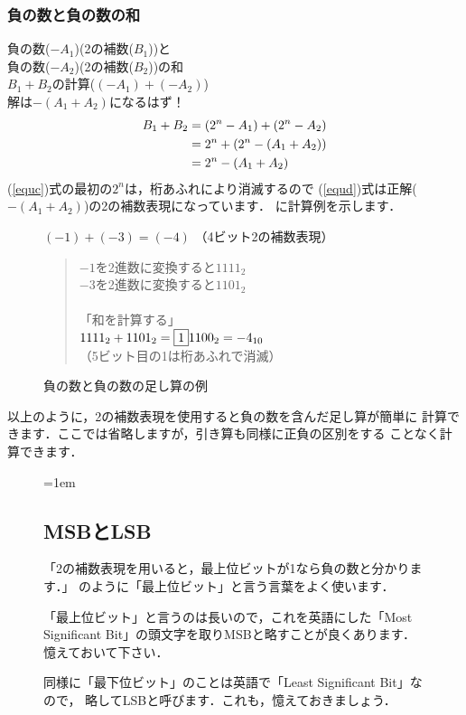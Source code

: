 \subsubsection{負の数と負の数の和}
負の数($-A_1$)(2の補数($B_1$))と\\
負の数($-A_2$)(2の補数($B_2$))の和\\
$B_1 + B_2$の計算($(-A_1) + (-A_2)$)\\
解は$-(A_1 + A_2)$になるはず！
{\small\begin{align}
B_1 + B_2 &= (2^n - A_1) + (2^n - A_2) \notag \\
          &= 2^n + (2^n - (A_1 + A_2)) \label{equc} \\
          &= 2^n - (A_1 + A_2)         \label{equd}
\end{align}}
(\ref{equc})式の最初の$2^n$は，桁あふれにより消滅するので
(\ref{equd})式は正解($-(A_1 + A_2)$)の2の補数表現になっています．
に計算例を示します．

\begin{figure}[tbp]
\begin{center}
\parbox{0.9\columnwidth}{\small
$(-1)+(-3)=(-4)$ （4ビット2の補数表現） \\
\begin{quote}
$-1$を2進数に変換すると$1111_2$ \\
$-3$を2進数に変換すると$1101_2$ \\
\\
「和を計算する」 \\
$1111_2 + 1101_2 = \fbox{1}1100_2 =  -4_{10}$ \\
（5ビット目の1は桁あふれで消滅） 
\end{quote}}
\caption{負の数と負の数の足し算の例}
\label{fig:chap2:addex3}
\end{center}
\end{figure}

以上のように，2の補数表現を使用すると負の数を含んだ足し算が簡単に
計算できます．ここでは省略しますが，引き算も同様に正負の区別をする
ことなく計算できます．

\begin{figure}[b]
\begin{framed}{\parindent=1em
\subsection*{MSBとLSB}
「2の補数表現を用いると，最上位ビットが1なら負の数と分かります．」
のように「最上位ビット」と言う言葉をよく使います．

「最上位ビット」と言うのは長いので，これを英語にした「Most Significant
Bit」の頭文字を取りMSBと略すことが良くあります．憶えておいて下さい．

同様に「最下位ビット」のことは英語で「Least Significant Bit」なので，
略してLSBと呼びます．これも，憶えておきましょう．
}\end{framed}
\end{figure}

